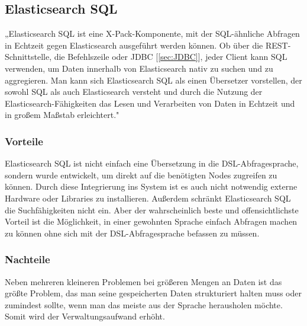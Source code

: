 \subsection{Elasticsearch SQL}
„Elasticsearch SQL ist eine X-Pack-Komponente, mit der SQL-ähnliche Abfragen in Echtzeit gegen Elasticsearch ausgeführt werden können. Ob über die REST-Schnittstelle, die Befehlszeile oder JDBC [\ref{sec:JDBC}], jeder Client kann SQL verwenden, um Daten innerhalb von Elasticsearch nativ zu suchen und zu aggregieren. Man kann sich Elasticsearch SQL als einen Übersetzer vorstellen, der sowohl SQL als auch Elasticsearch versteht und durch die Nutzung der Elasticsearch-Fähigkeiten das Lesen und Verarbeiten von Daten in Echtzeit und in großem Maßstab erleichtert." \cite{Elasticsearch-SQL}
\subsubsection{Vorteile}
Elasticsearch SQL ist nicht einfach eine Übersetzung in die DSL-Abfragesprache, sondern wurde entwickelt, um direkt auf die benötigten Nodes zugreifen zu können. Durch diese Integrierung ins System ist es auch nicht notwendig externe Hardware oder Libraries zu installieren. Außerdem schränkt Elasticsearch SQL die Suchfähigkeiten nicht ein. Aber der wahrscheinlich beste und offensichtlichste Vorteil ist die Möglichkeit, in einer gewohnten Sprache einfach Abfragen machen zu können ohne sich mit der DSL-Abfragesprache befassen zu müssen.
\subsubsection{Nachteile}
Neben mehreren kleineren Problemen bei größeren Mengen an Daten ist das größte Problem, das man seine gespeicherten Daten strukturiert halten muss oder zumindest sollte, wenn man das meiste aus der Sprache herausholen möchte. Somit wird der Verwaltungsaufwand erhöht.
